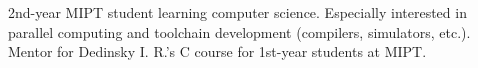 \documentclass[9pt]{developercv} %
\begin{document}
\vspace{0.5cm}



\begin{minipage}[t]{0.4\textwidth} %
        \vspace{-\baselineskip} %
        2nd-year MIPT student learning computer science. Especially interested in parallel computing and toolchain development (compilers, simulators, etc.). Mentor for Dedinsky I. R.'s C course for 1st-year students at MIPT.

\end{minipage}
\hfill %
\begin{minipage}[t]{0.5\textwidth} %
        \vspace{-\baselineskip} %
        \begin{barchart}{5.5}
        \end{barchart}
\end{minipage}



\end{document}
